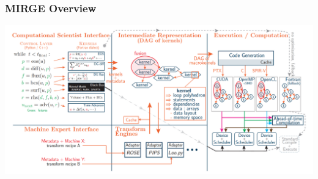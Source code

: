 
\begin{frame}\frametitle{MIRGE Overview}
\includegraphics[width=\textwidth]{figures/MIRGE.png}
\end{frame}

